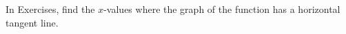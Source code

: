 \begin{exerciseset}{In Exercises}{, find the $x$-values where the graph of the function has a horizontal tangent line.}





\end{exerciseset}
